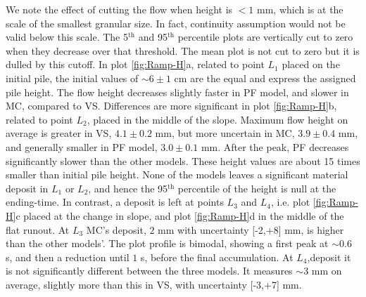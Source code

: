 \documentclass{article}
\begin{document}
We note the effect of cutting the flow when height is $<1$ mm, which is at the scale of the smallest granular size. In fact, continuity assumption would not be valid below this scale. The 5$^{\mathrm{th}}$ and 95$^{\mathrm{th}}$ percentile plots are vertically cut to zero when they decrease over that threshold. The mean plot is not cut to zero but it is dulled by this cutoff. In plot \ref{fig:Ramp-H}a, related to point $L_1$ placed on the initial pile, the initial values of $\sim 6\pm 1$ cm are the equal and express the assigned pile height. The flow height decreases slightly faster in PF model, and slower in MC, compared to VS. Differences are more significant in plot \ref{fig:Ramp-H}b, related to point $L_2$, placed in the middle of the slope. Maximum flow height on average is greater in VS, $4.1\pm 0.2$ mm, but more uncertain in MC, $3.9\pm 0.4$ mm, and generally smaller in PF model, $3.0\pm 0.1$ mm. After the peak, PF decreases significantly slower than the other models. These height values are about 15 times smaller than initial pile height. None of the models leaves a significant material deposit in $L_1$ or $L_2$, and hence the 95$^{\mathrm{th}}$ percentile of the height is null at the ending-time. In contrast, a deposit is left at points $L_3$ and $L_4$, i.e. plot \ref{fig:Ramp-H}c placed at the change in slope, and plot \ref{fig:Ramp-H}d in the middle of the flat runout. At $L_3$ MC's deposit, $2$ mm with uncertainty [-2,+8] mm, is higher than the other models'. The plot profile is bimodal, showing a first peak at $\sim 0.6$ s, and then a reduction until $1$ s, before the final accumulation. At $L_4$,deposit it is not significantly different between the three models. It measures $\sim 3$ mm on average, slightly more than this in VS, with uncertainty [-3,+7] mm.
\end{document}
